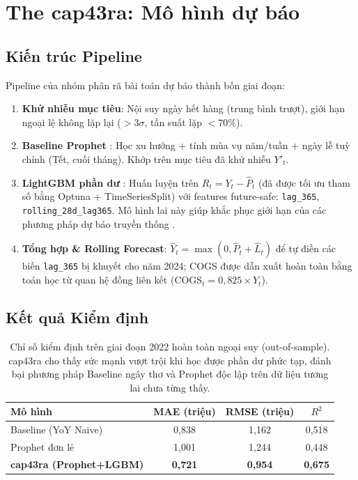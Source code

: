 \documentclass{article}
\begin{document}
\section{The cap43ra: Mô hình dự báo}

\subsection{Kiến trúc Pipeline}

Pipeline của nhóm phân rã bài toán dự báo thành bốn giai đoạn:

\begin{enumerate}
    \item \textbf{Khử nhiễu mục tiêu}: Nội suy ngày hết hàng (trung bình trượt), giới hạn ngoại lệ không lặp lại ($>3\sigma$, tần suất lặp $<70\%$).
    \item \textbf{Baseline Prophet} \cite{taylor2018prophet}: Học xu hướng + tính mùa vụ năm/tuần + ngày lễ tuỳ chỉnh (Tết, cuối tháng). Khớp trên mục tiêu đã khử nhiễu $Y'_t$.
    \item \textbf{LightGBM phần dư} \cite{ke2017lightgbm}: Huấn luyện trên $R_t = Y_t - \hat{P}_t$ (đã được tối ưu tham số bằng Optuna + TimeSeriesSplit) với features future-safe: \texttt{lag\_365}, \texttt{rolling\_28d\_lag365}. Mô hình lai này giúp khắc phục giới hạn của các phương pháp dự báo truyền thống \cite{makridakis2018forecasting}.
    \item \textbf{Tổng hợp \& Rolling Forecast}: $\hat{Y}_t = \max(0, \hat{P}_t + \hat{L}_t)$ để tự điền các biến \texttt{lag\_365} bị khuyết cho năm 2024; COGS được dẫn xuất hoàn toàn bằng toán học từ quan hệ đồng liên kết ($\text{COGS}_t = 0{,}825 \times \hat{Y}_t$).
\end{enumerate}

\subsection{Kết quả Kiểm định}

\begin{table}[h]
  \caption{Chỉ số kiểm định trên giai đoạn 2022 hoàn toàn ngoại suy (out-of-sample). cap43ra cho thấy sức mạnh vượt trội khi học được phần dư phức tạp, đánh bại phương pháp Baseline ngây thơ và Prophet độc lập trên dữ liệu tương lai chưa từng thấy.}
  \label{tab:results}
  \centering
  \begin{tabular}{lccc}
    \toprule
    \textbf{Mô hình} & \textbf{MAE (triệu)} & \textbf{RMSE (triệu)} & \textbf{$R^2$} \\
    \midrule
    Baseline (YoY Naive)              & 0,838 & 1,162 & 0,518 \\
    Prophet đơn lẻ                    & 1,001 & 1,244 & 0,448 \\
    \textbf{cap43ra (Prophet+LGBM)} & \textbf{0,721} & \textbf{0,954} & \textbf{0,675} \\
    \bottomrule
  \end{tabular}
\end{table}
\end{document}
